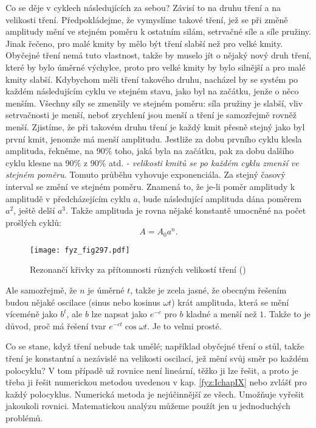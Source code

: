 {    Co se děje v cyklech následujících za sebou? Závisí to na druhu tření a na velikosti tření. 
    Předpokládejme, že vymyslíme takové tření, jež se při změně amplitudy mění ve stejném poměru k 
    ostatním silám, setrvačné síle a síle pružiny. Jinak řečeno, pro malé kmity by mělo být tření 
    slabší než pro velké kmity. Obyčejné tření nemá tuto vlastnost, takže by muselo jít o nějaký 
    nový druh tření, které by bylo úměrné výchylce, proto pro velké kmity by bylo silnější a pro 
    malé kmity slabší. Kdybychom měli tření takového druhu, nacházel by se systém po každém 
    následujícím cyklu ve stejném stavu, jako byl na začátku, jenže o něco menším. Všechny síly se 
    zmenšily ve stejném poměru: síla pružiny je slabší, vliv setrvačnosti je menší, neboť zrychlení 
    jsou menší a tření je samozřejmě rovněž menší. Zjistíme, že při takovém druhu tření je každý 
    kmit přesně stejný jako byl první kmit, jenomže má menší amplitudu. Jestliže za dobu prvního 
    cyklu klesla amplituda, řekněme, na 90\% toho, jaká byla na začátku, pak za dobu dalšího cyklu 
    klesne na 90\% z 90\% atd. \emph{- velikosti kmitů se po každém cyklu zmenší ve stejném 
    poměru}. Tomuto průběhu vyhovuje exponenciála. Za stejný časový interval se změní ve stejném 
    poměru. Znamená to, že je-li poměr amplitudy k amplitudě v předcházejícím cyklu \(a\), bude 
    následující amplituda dána poměrem \(a^2\), ještě delší \(a^3\). Takže amplituda je rovna 
    nějaké konstantě umocněné na počet prošlých cyklů:
    \begin{equation}\label{fyz:eq347}
      A = A_0a^n.
    \end{equation}

    \begin{figure}[ht!] %
      \centering
      \texttt{[image: fyz\_fig297.pdf]}
      \caption{Rezonančí křivky za přítomnosti různých velikostí tření 
               (\cite[s.~427]{Feynman01})}
      \label{fyz:fig297}
    \end{figure}
    
    Ale samozřejmě, že \(n\) je úměrné \(t\), takže je zcela jasné, že obecným řešením budou nějaké 
    oscilace (sinus nebo kosinus \(\omega t\)) krát amplituda, která se mění víceméně jako \(b^t\), 
    ale \(b\) lze napsat jako \(e^{-c}\) pro \(b\) kladné a menší než \(1\). Takže to je důvod, 
    proč má řešení tvar \(e^{-ct}\cos\omega t\). Je to velmi prosté.
    
    Co se stane, když tření nebude tak umělé; například obyčejné tření o stůl, takže tření je 
    konstantní a nezávislé na velikosti oscilací, jež mění svůj směr po každém polocyklu? V tom 
    případě už rovnice není lineární, těžko ji lze řešit, a proto je třeba ji řešit numerickou 
    metodou uvedenou v kap. \ref{fyz:IchapIX} nebo zvlášť pro každý polocyklus. Numerická metoda je 
    nejúčinnější ze všech. Umožňuje vyřešit jakoukoli rovnici. Matematickou analýzu můžeme použít 
    jen u jednoduchých problémů.
    
}
